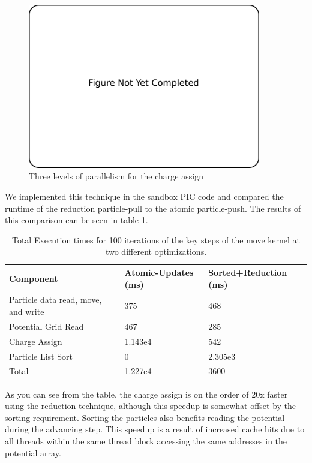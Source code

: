 \begin{figure}
\begin{center}
\includegraphics[width=4in]{introduction/not_finished.pdf}
\end{center}
\caption{Three levels of parallelism for the charge assign}
\label{fig:pic_flowchart_parallel}
\end{figure}

We implemented this technique in the sandbox PIC code and compared the runtime of the reduction particle-pull to the atomic particle-push. The results of this comparison can be seen in table \ref{tab:GPUPIC_comparison}.

\noindent \begin{table}
\begin{tabular}{| p{4.0cm} | p{3.5cm} | p{3.5cm} |}
\hline
Component & Atomic-Updates (ms) & Sorted+Reduction (ms) \\ \hline
Particle data read, move, and write & 375 & 468 \\ \hline
Potential Grid Read & 467 & 285 \\ \hline
Charge Assign & 1.143e4 & 542 \\ \hline
Particle List Sort & 0 & 2.305e3 \\ \hline
Total & 1.227e4 & 3600 \\ \hline
\end{tabular}
\caption{Total Execution times for 100 iterations of the key steps of the move kernel at two different optimizations.}
\label{tab:GPUPIC_comparison}
\end{table}
As you can see from the table, the charge assign is on the order of 20x faster using the reduction technique, although this speedup is somewhat offset by the sorting requirement. Sorting the particles also benefits reading the potential during the advancing step. This speedup is a result of increased cache hits due to all threads within the same thread block accessing the same addresses in the potential array. 

